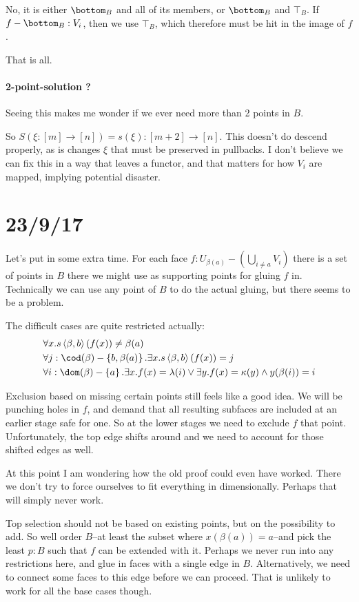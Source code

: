 \documentclass{tac}
\newcommand\set[1]{\left\{#1\right\}}
\newcommand\of{:}
\newcommand\tuplet[1]{\left\langle #1 \right\rangle}
\begin{document}
No, it is either $\bottom_B$ and all of its members, or $\bottom_B$ and $\top_B$. If $f-\bottom_B\of V_i$, then we use $\top_B$, which therefore must be hit in the image of $f$.

That is all.

\paragraph{2-point-solution ?}
Seeing this makes me wonder if we ever need more than 2 points in $B$. 

So $S(\xi\of[m]\to[n])  = s(\xi)\of[m + 2]\to [n]$. This doesn't do descend properly, as is changes $\xi$ that must be preserved in pullbacks. I don't believe we can fix this in a way that leaves a functor, and that matters for how $V_i$ are mapped, implying potential disaster.

\section{23/9/17}
Let's put in some extra time. For each face $f\of U_{\beta(a)}-(\bigcup_{i\neq a}V_i)$ there is a set of points in $B$ there we might use as supporting points for gluing $f$ in. Technically we can use any point of $B$ to do the actual gluing, but there seems to be a problem.

The difficult cases are quite restricted actually:
\begin{align*}
&\forall x. s\tuplet{\beta,b}(f(x))\neq \beta(a)\\
&\forall j\of\cod(\beta) - \set{b,\beta(a)}.\exists x.s\tuplet{\beta,b}(f(x)) = j\\
&\forall i\of\dom(\beta) - \set a.\exists x.f(x) = \lambda(i) \vee \exists y.f(x) = \kappa(y) \land y(\beta(i)) = i
\end{align*}

Exclusion based on missing certain points still feels like a good idea. We will be punching holes in $f$, and demand that all resulting subfaces are included at an earlier stage safe for one. So at the lower stages we need to exclude $f$ that point. Unfortunately, the top edge shifts around and we need to account for those shifted edges as well.

At this point I am wondering how the old proof could even have worked. There we don't try to force ourselves to fit everything in dimensionally.
Perhaps that will simply never work.

Top selection should not be based on existing points, but on the possibility to add.
So well order $B$--at least the subset where $x(\beta(a)) = a$--and pick the least $p\of B$ such that $f$ can be extended with it.
Perhaps we never run into any restrictions here, and glue in faces with a single edge in $B$.
Alternatively, we need to connect some faces to this edge before we can proceed.
That is unlikely to work for all the base cases though.
\end{document}
